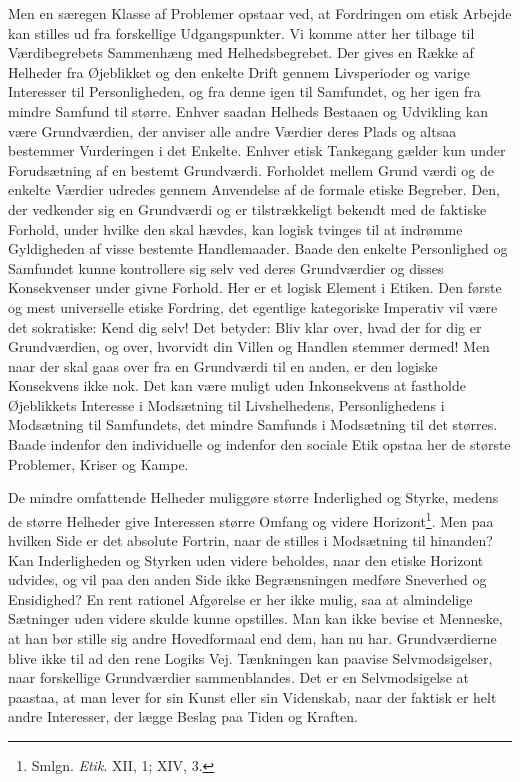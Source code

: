 \documentclass[12pt,a4paper]{book}
\newcommand{\opage}[1]{\marginnote{\footnotesize\textit{[#1]}}}
\begin{document}
Men en særegen Klasse af Problemer opstaar ved, at Fordringen om etisk Arbejde kan stilles
ud fra forskellige Udgangspunkter. Vi komme atter her tilbage til Værdibegrebets
Sammenhæng med Helhedsbegrebet. Der gives en Række af Helheder fra Øjeblikket og den
enkelte Drift gennem Livsperioder og varige Interesser til Personligheden, og fra denne
igen til Samfundet, og her igen fra mindre Samfund til større. Enhver saadan Helheds
Bestaaen og Udvikling kan være Grundværdien, der anviser alle andre Værdier deres Plads og
altsaa bestemmer Vurderingen i det Enkelte. Enhver etisk Tankegang gælder kun under
Forudsætning af en bestemt Grundværdi. Forholdet mellem Grund%
\opage{360}værdi og de enkelte Værdier
udredes gennem Anvendelse af de formale etiske Begreber. Den, der vedkender sig en
Grundværdi og er tilstrækkeligt bekendt med de faktiske Forhold, under hvilke den skal
hævdes, kan logisk tvinges til at indrømme Gyldigheden af visse bestemte Handlemaader.
Baade den enkelte Personlighed og Samfundet kunne kontrollere sig selv ved deres
Grundværdier og disses Konsekvenser under givne Forhold. Her er et logisk Element i Etiken.
Den første og mest universelle etiske Fordring, det egentlige kategoriske Imperativ vil
være det sokratiske: Kend dig selv! Det betyder: Bliv klar over, hvad der for dig er
Grundværdien, og over, hvorvidt din Villen og Handlen stemmer dermed! Men naar der skal
gaas over fra en Grundværdi til en anden, er den logiske Konsekvens ikke nok. Det kan være
muligt uden Inkonsekvens at fastholde Øjeblikkets Interesse i Modsætning til Livshelhedens,
Personlighedens i Modsætning til Samfundets, det mindre Samfunds i Modsætning til det størres. Baade indenfor den individuelle og indenfor den sociale Etik opstaa her de største
Problemer, Kriser og Kampe.

De mindre omfattende Helheder muliggøre større Inderlighed og Styrke, medens de større
Helheder give Interessen større Omfang og videre Horizont\footnote{Smlgn. \emph{Etik}. XII,
1; XIV, 3.}. Men paa hvilken Side er det absolute Fortrin, naar de stilles i Modsætning til
hinanden? Kan Inderligheden og Styrken uden videre beholdes, naar den etiske Horizont
udvides, og vil paa den anden Side ikke Begrænsningen medføre Sneverhed og Ensidighed? En
rent rationel Afgørelse er her ikke mulig, saa at almindelige Sætninger uden videre skulde
kunne opstilles. Man kan ikke bevise et Menneske, at han bør stille sig andre Hovedformaal
end dem, han nu har. Grundværdierne blive ikke til ad den rene Logiks Vej. Tænkningen kan
paavise Selvmodsigelser, naar forskellige Grundværdier sammenblandes. Det er en
Selvmodsigelse at paastaa, at man lever for sin Kunst eller sin Videnskab, naar der faktisk
er helt andre Interesser, der lægge Beslag paa Tiden og Kraften.
\end{document}
